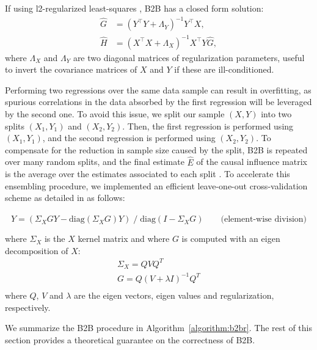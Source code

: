 \documentclass[preprint,12pt,3p]{elsarticle}
\begin{document}
If using l2-regularized least-squares \citep{hoerl1959optimum, rifkin2007notes},
B2B has a closed form solution:
\begin{align}
    \hat G &= (Y^\top Y + \Lambda_Y)^{-1} Y^\top X,\label{eq:solG}\\
    \hat H &=(X^\top X + \Lambda_X)^{-1} X^\top Y \hat G,\label{eq:solH}
\end{align}
%
where $\Lambda_X$ and $\Lambda_Y$ are two diagonal matrices of regularization
parameters, useful to invert the covariance matrices of $X$ and $Y$ if these are
ill-conditioned.

Performing two regressions over the same data sample can result in overfitting,
as spurious correlations in the data absorbed by the first regression will be
leveraged by the second one.
%
To avoid this issue, we split our sample $(X, Y)$ into two splits $(X_1, Y_1)$
and $(X_2, Y_2)$.
%
Then, the first regression is performed using $(X_1, Y_1)$, and the second
regression is performed using $(X_2, Y_2)$.
%
To compensate for the reduction in sample size caused by the split, B2B is
repeated over many random splits, and the final estimate $\hat E$ of the causal
influence matrix is the average over the estimates associated to each split
\citep{breiman1996bagging}.
%
To accelerate this ensembling procedure, we implemented an efficient
leave-one-out cross-validation scheme as detailed in \citep{rifkin2007notes}
as follows:
%

\begin{equation}
\hat{Y} = (\Sigma_X G Y - \text{diag}(\Sigma_X G) Y) \;/\; \text{diag}(I - \Sigma_X G) \qquad \text{(element-wise division)}
\end{equation}

where $\Sigma_X$ is the $X$ kernel matrix and where $G$ is computed with an
eigen decomposition of $X$:
\begin{equation}
  \begin{aligned}
  \Sigma_X = Q V Q^T \\
  G = Q (V + \lambda I)^{-1} Q^T\\
  \end{aligned}
\end{equation}
where $Q$, $V$ and $\lambda$ are the eigen vectors, eigen values and
regularization, respectively.

%

We summarize the B2B procedure in Algorithm~\ref{algorithm:b2br}.
%
The rest of this section provides a theoretical guarantee on the correctness of
B2B.
\end{document}
